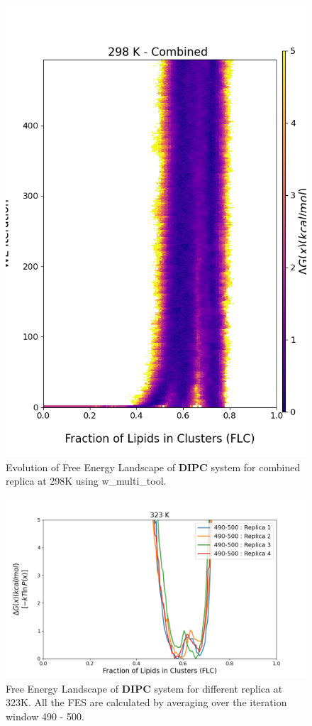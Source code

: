\documentclass{biophys-new}
\begin{document}
\begin{figure}[hbt!]
\centering
\includegraphics[width=0.8\linewidth]{all_plots/ClusterLipids2Total/DPPC_DIPC_CHOL/298K/Evolution_DIPC_MULTI__298_ClusterLipids2Total.png}
\caption{Evolution of Free Energy Landscape of \textbf{DIPC} system for combined replica at 298K using w\_multi\_tool.}
\label{fig:view}

\end{figure}


\begin{figure}[hbt!]
\centering
\includegraphics[width=1.1\linewidth]{all_plots/ClusterLipids2Total/DPPC_DIPC_CHOL/323K/Average_DIPC_323_ClusterLipids2Total.png}
\caption{Free Energy Landscape of \textbf{DIPC} system for different replica at 323K. All the FES are calculated by averaging over the iteration window 490 - 500.}
\label{fig:view}

\end{figure}
\end{document}
